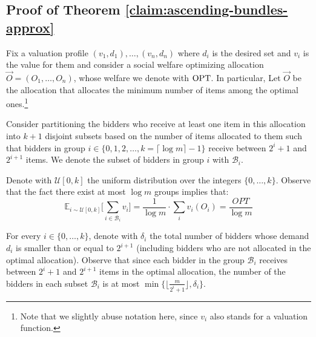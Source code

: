 \subsection{Proof of Theorem \ref{claim:ascending-bundles-approx}}
Fix a valuation profile $(v_1,d_1),\ldots,(v_n,d_n)$ where $d_i$ is the desired set and $v_i$ is the value for them and
consider a social welfare optimizing allocation $\vec O=(O_1,\ldots,O_n)$, whose  welfare we denote with $\text{OPT}$. In particular, Let $\vec O$ be the allocation that allocates the minimum number of items among the optimal ones.\footnote{Note that we slightly abuse notation here, since $v_i$ also stands for a valuation function.}   

Consider partitioning the bidders who receive at least one item in this allocation into $k+1$ disjoint subsets based on the number of items allocated to them 
such that bidders in group $i\in \{0,1, 2, \dots, k=\lceil \log{m} \rceil-1\}$ receive between $2^{i}+1$ and $2^{i+1}$ items. We denote the subset of bidders in group $i$ with $\mathcal B_i$. 

Denote with $\mathcal U[0,k]$ the uniform distribution over the integers $\{0,\ldots,k\}$. Observe that the fact there exist at most $\log m$ groups implies that: 
\begin{equation}\label{eq-opt-lb}
\mathbb{E}_{i \sim \mathcal{U}[0, k]} \big[\sum_{i \in \mathcal B_i} v_i\big] = 
\frac{1}{\log m} \cdot \sum_i v_i(O_i)= \frac{OPT}{\log m}
\end{equation}

For every $i\in \{0,\ldots,k\}$, denote with $\delta_i$ the total number of bidders whose demand $d_i$ is smaller than or equal to $2^{i+1}$ (including bidders who are not allocated in the optimal allocation).  Observe that since
each bidder in the group $\mathcal B_i$ receives between $2^{i}+1$ and $2^{i+1}$ items in the optimal allocation, the number of the bidders in each subset  $\mathcal B_i$ is at most 
$\min\{\Big\lfloor \frac{m}{2^{i}+1}\Big\rfloor ,\delta_i\}$.  

